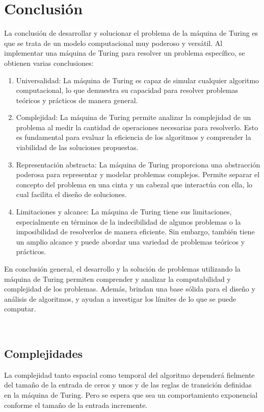 \chapter{Conclusión}
La conclusión de desarrollar y solucionar el problema de la máquina de Turing es que se trata de un modelo computacional muy poderoso y versátil. Al implementar una máquina de Turing para resolver un problema específico, se obtienen varias conclusiones:\newline
\begin{enumerate}
    \item Universalidad: La máquina de Turing es capaz de simular cualquier algoritmo computacional, lo que demuestra su capacidad para resolver problemas teóricos y prácticos de manera general.\newline
    \item Complejidad: La máquina de Turing permite analizar la complejidad de un problema al medir la cantidad de operaciones necesarias para resolverlo. Esto es fundamental para evaluar la eficiencia de los algoritmos y comprender la viabilidad de las soluciones propuestas.\newline

    \item Representación abstracta: La máquina de Turing proporciona una abstracción poderosa para representar y modelar problemas complejos. Permite separar el concepto del problema en una cinta y un cabezal que interactúa con ella, lo cual facilita el diseño de soluciones.\newline
    
    \item Limitaciones y alcance: La máquina de Turing tiene sus limitaciones, especialmente en términos de la indecibilidad de algunos problemas o la imposibilidad de resolverlos de manera eficiente. Sin embargo, también tiene un amplio alcance y puede abordar una variedad de problemas teóricos y prácticos.\newline
\end{enumerate}

En conclusión general, el desarrollo y la solución de problemas utilizando la máquina de Turing permiten comprender y analizar la computabilidad y complejidad de los problemas. Además, brindan una base sólida para el diseño y análisis de algoritmos, y ayudan a investigar los límites de lo que se puede computar.

\\

\section{Complejidades}
La complejidad tanto espacial como temporal del algoritmo dependerá fielmente del tamaño de la entrada de ceros y unos y de las reglas de transición definidas en la máquina de Turing. Pero se espera que sea un comportamiento exponencial conforme el tamaño de la entrada incremente.
